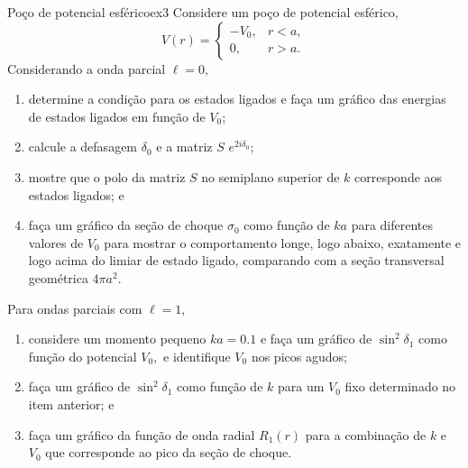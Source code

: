 \begin{exercício}{Poço de potencial esférico}{ex3}
   Considere um poço de potencial esférico,
   \begin{equation*}
       V(r) = \begin{cases}
          -V_0,&r < a,\\
          0, & r > a.
       \end{cases}
   \end{equation*}
   Considerando a onda parcial \(\ell = 0,\)
   \begin{enumerate}[label=(\alph*)]
       \item determine a condição para os estados ligados e faça um gráfico das energias de estados ligados em função de \(V_0\);
       \item calcule a defasagem \(\delta_0\) e a matriz \(S\) \(e^{2i \delta_0}\);
       \item mostre que o polo da matriz \(S\) no semiplano superior de \(k\) corresponde aos estados ligados; e
       \item faça um gráfico da seção de choque \(\sigma_0\) como função de \(ka\) para diferentes valores de \(V_0\) para mostrar o comportamento longe, logo abaixo, exatamente e logo acima do limiar de estado ligado, comparando com a seção transversal geométrica \(4\pi a^2.\)
   \end{enumerate}
   Para ondas parciais com \(\ell = 1,\)
   \begin{enumerate}[label=(\alph*)]
       \item considere um momento pequeno \(ka = 0.1\) e faça um gráfico de \(\sin^2\delta_1\) como função do potencial \(V_0,\) e identifique \(V_0\) nos picos agudos;
       \item faça um gráfico de \(\sin^2\delta_1\) como função de \(k\) para um \(V_0\) fixo determinado no item anterior; e
       \item faça um gráfico da função de onda radial \(R_1(r)\) para a combinação de \(k\) e \(V_0\) que corresponde ao pico da seção de choque.
   \end{enumerate}
\end{exercício}
